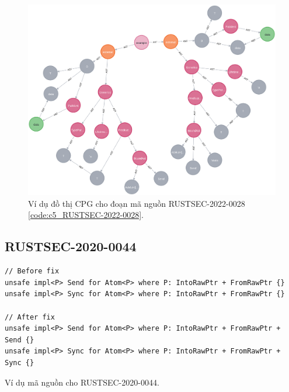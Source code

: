 

\begin{figure}[H]
    \includegraphics[width=1\columnwidth]{figures/c5/c5_RUSTSEC-2022-0028.png}
    \centering
    \caption{Ví dụ đồ thị CPG cho đoạn mã nguồn RUSTSEC-2022-0028 \ref{code:c5_RUSTSEC-2022-0028}.}
    \label{img:c5_RUSTSEC-2022-0028}
\end{figure}


\subsection{RUSTSEC-2020-0044}


\begin{listing}[H]
\begin{verbatim}
// Before fix
unsafe impl<P> Send for Atom<P> where P: IntoRawPtr + FromRawPtr {}
unsafe impl<P> Sync for Atom<P> where P: IntoRawPtr + FromRawPtr {}

// After fix
unsafe impl<P> Send for Atom<P> where P: IntoRawPtr + FromRawPtr + Send {}
unsafe impl<P> Sync for Atom<P> where P: IntoRawPtr + FromRawPtr + Sync {}
\end{verbatim}
\caption{Ví dụ mã nguồn cho RUSTSEC-2020-0044.}
\label{code:c5_RUSTSEC-2020-0044}
\end{listing}

